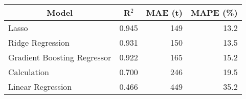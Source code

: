 
\begin{tabular}[t]{lrrr}
\toprule
\multicolumn{1}{c}{Model} & \multicolumn{1}{c}{R$^2$} & \multicolumn{1}{c}{MAE (t)} & \multicolumn{1}{c}{MAPE (\%)}\\
\midrule
Lasso & 0.945 & 149 & 13.2\\
Ridge Regression & 0.931 & 150 & 13.5\\
Gradient Boosting Regressor & 0.922 & 165 & 15.2\\
Calculation & 0.700 & 246 & 19.5\\
Linear Regression & 0.466 & 449 & 35.2\\
\bottomrule
\end{tabular}
